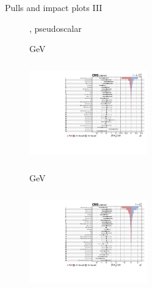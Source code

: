 \documentclass[8pt]{beamer}
\begin{document}
\begin{frame}{Pulls and impact plots III}
\justifying
\begin{figure}[htbp]
\centering
\begin{block}{, pseudoscalar}\end{block}	\vspace{-8pt}

\begin{minipage}[b]{0.49\textwidth}
\begin{center}
\centering \begin{block}{ GeV}\end{block}	
\includegraphics[width=5.1cm, height=4.2cm]{figs/impacts_2017_both_pseudo_100.pdf}
\end{center}
\end{minipage}\hfill
\begin{minipage}[b]{0.49\textwidth}
\begin{center}
\centering \begin{block}{ GeV}\end{block}	
\includegraphics[width=5.1cm, height=4.2cm]{figs/impacts_2017_both_pseudo_500.pdf}
\end{center}
\end{minipage} \hfill
\end{figure}
\end{frame}
\end{document}
